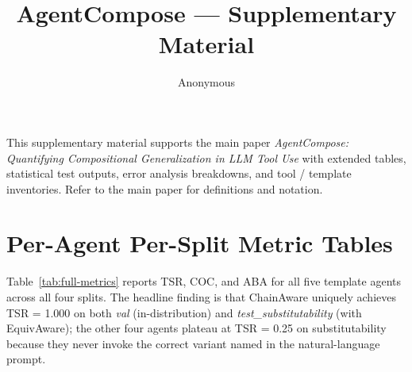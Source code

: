 \documentclass[10pt]{article}
\title{AgentCompose --- Supplementary Material}
\author{Anonymous}
\date{}
\begin{document}
\maketitle

This supplementary material supports the main paper \emph{AgentCompose:
Quantifying Compositional Generalization in LLM Tool Use} with extended
tables, statistical test outputs, error analysis breakdowns, and tool /
template inventories. Refer to the main paper for definitions and notation.

\section{Per-Agent Per-Split Metric Tables}
\label{app:per-agent-metrics}

Table~\ref{tab:full-metrics} reports TSR, COC, and ABA for all five template
agents across all four splits. The headline finding is that ChainAware
uniquely achieves TSR = 1.000 on both \emph{val} (in-distribution) and
\emph{test\_substitutability} (with EquivAware); the other four agents
plateau at TSR = 0.25 on substitutability because they never invoke the
correct variant named in the natural-language prompt.
\end{document}
